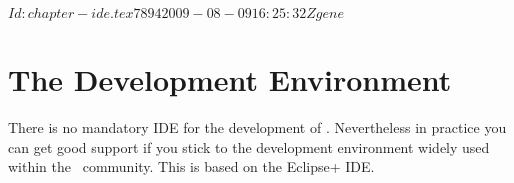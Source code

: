 \SVN$Id: chapter-ide.tex 7894 2009-08-09 16:25:32Z gene $
\chapter{The Development Environment}

There is no mandatory IDE for the development of \ExTeX. Nevertheless
in practice you can get good support if you stick to the development
environment widely used within the \ExTeX\ community. This is based on
the \+Eclipse+ IDE.






